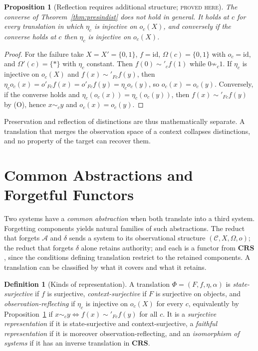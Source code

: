 \documentclass[11pt]{article}
\newtheorem{proposition}[theorem]{Proposition}
\theoremstyle{definition}
\newtheorem{definition}[theorem]{Definition}
\theoremstyle{remark}
\newcommand{\stN}{\textsc{proved here}}
\newcommand{\cC}{\mathcal C}
\newcommand{\cA}{\mathcal A}
\newcommand{\CRS}{\mathbf{CRS}}
\newcommand{\id}{\mathrm{id}}
\newcommand{\sk}{\sim}
\begin{document}
\begin{proposition}[Reflection requires additional structure; \stN]\label{prop:reflection}
The converse of Theorem~\ref{thm:presindist} does not hold in general. It holds at $c$ for every translation in which $\eta_c$ is injective on $o_c(X)$, and conversely if the converse holds at $c$ then $\eta_c$ is injective on $o_c(X)$.
\end{proposition}
\begin{proof}
For the failure take $X=X'=\{0,1\}$, $f=\id$, $\Omega(c)=\{0,1\}$ with $o_c=\id$, and $\Omega'(c)=\{\ast\}$ with $\eta_c$ constant. Then $f(0)\sk'_cf(1)$ while $0\not\sk_c1$. If $\eta_c$ is injective on $o_c(X)$ and $f(x)\sk'_{Fc}f(y)$, then $\eta_co_c(x)=o'_{Fc}f(x)=o'_{Fc}f(y)=\eta_co_c(y)$, so $o_c(x)=o_c(y)$. Conversely, if the converse holds and $\eta_c(o_c(x))=\eta_c(o_c(y))$, then $f(x)\sk'_{Fc}f(y)$ by (O), hence $x\sk_cy$ and $o_c(x)=o_c(y)$.
\end{proof}

Preservation and reflection of distinctions are thus mathematically separate. A translation that merges the observation space of a context collapses distinctions, and no property of the target can recover them.

\section{Common Abstractions and Forgetful Functors}

Two systems have a \emph{common abstraction} when both translate into a third system. Forgetting components yields natural families of such abstractions. The reduct that forgets $\cA$ and $\delta$ sends a system to its observational structure $(\cC,X,\Omega,o)$; the reduct that forgets $\delta$ alone retains authority; and each is a functor from $\CRS$, since the conditions defining translation restrict to the retained components. A translation can be classified by what it covers and what it retains.

\begin{definition}[Kinds of representation]\label{def:kinds}
A translation $\Phi=(F,f,\eta,\alpha)$ is \emph{state-surjective} if $f$ is surjective, \emph{context-surjective} if $F$ is surjective on objects, and \emph{observation-reflecting} if $\eta_c$ is injective on $o_c(X)$ for every $c$, equivalently by Proposition~\ref{prop:reflection} if $x\sk_cy\Leftrightarrow f(x)\sk'_{Fc}f(y)$ for all $c$. It is a \emph{surjective representation} if it is state-surjective and context-surjective, a \emph{faithful representation} if it is moreover observation-reflecting, and an \emph{isomorphism of systems} if it has an inverse translation in $\CRS$.
\end{definition}
\end{document}
